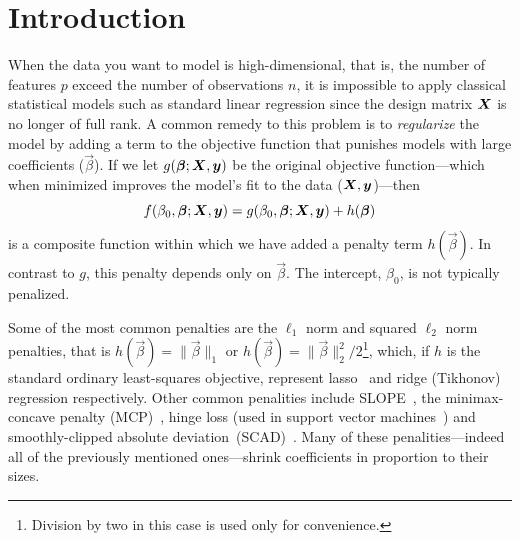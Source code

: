 \section{Introduction}

When the data you want to model is high-dimensional, that is, the number of features \(p\)
exceed the number of observations \(n\), it is impossible to apply classical statistical
models such as standard linear regression since the design matrix \(\boldsymbol X\) is no longer
of full rank. A common remedy to this problem is to \emph{regularize} the model by adding a
term to the objective function that punishes models with large coefficients
(\(\vec\beta\)). If we let \(g(\boldsymbol\beta; \boldsymbol X, \boldsymbol y)\) be the original objective
function---which when minimized improves the model's fit to the data (\(\boldsymbol X, \boldsymbol
y\))---then
\[
  f(\beta_0, \boldsymbol\beta; \boldsymbol X, \boldsymbol y) = g(\beta_0, \boldsymbol\beta; \boldsymbol X, \boldsymbol y) + h(\boldsymbol\beta)
\]
is a composite function within which we have added a penalty term \(h(\vec\beta)\). In
contrast to \(g\), this penalty depends only on \(\vec{\beta}\). The intercept,
\(\beta_0\), is not typically penalized.

Some of the most common penalties are the \(\ell_1\) norm and squared \(\ell_2\) norm
penalties, that is \(h(\vec\beta) = \lVert \vec\beta \rVert_1\) or \(h(\vec\beta) = \lVert
\vec\beta \rVert_2^2/2\)\footnote{Division by two in this case is used only for
  convenience.}, which, if \(h\) is the standard ordinary least-squares objective, represent
lasso~\citep{tibshirani1996,santosa1986,donoho1994} and ridge (Tikhonov) regression
respectively. Other common penalities include SLOPE~\citep{bogdan2013,bogdan2015}, the
minimax-concave penalty (MCP)~\citep{zhang2010}, hinge loss (used in support vector
machines~\citep{cortes1995}) and smoothly-clipped absolute
deviation~(SCAD)~\citep{fan2001}. Many of these penalities---indeed all of the previously
mentioned ones---shrink coefficients in proportion to their sizes.

